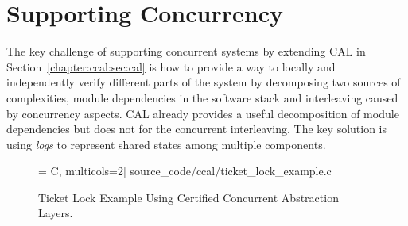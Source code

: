 \section{Supporting Concurrency}
\label{chapter:ccal:sec:ccal-overview}


The key challenge of supporting concurrent systems by extending CAL in Section~\ref{chapter:ccal:sec:cal}  is how to
provide a way to locally and independently verify different parts of the system 
by decomposing
two sources of complexities, module dependencies in the software stack and interleaving caused by concurrency aspects.
CAL already provides a useful decomposition of module dependencies but does not for the concurrent interleaving. 
The key solution is using 
\emph{logs}
to represent shared states among multiple components.

\begin{figure}
 = C, multicols=2] {source_code/ccal/ticket_lock_example.c}
\caption{Ticket Lock Example Using Certified Concurrent Abstraction Layers.}
\label{fig:chapter:ccal:sec:ccal-overview:ticket_lock_example}
\end{figure}

